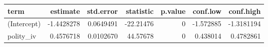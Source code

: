 
\begin{tabular}{l|r|r|r|r|r|r}
\hline
term & estimate & std.error & statistic & p.value & conf.low & conf.high\\
\hline
(Intercept) & -1.4428278 & 0.0649491 & -22.21476 & 0 & -1.572885 & -1.3181194\\
\hline
polity\_iv & 0.4576718 & 0.0102670 & 44.57678 & 0 & 0.438014 & 0.4782861\\
\hline
\end{tabular}